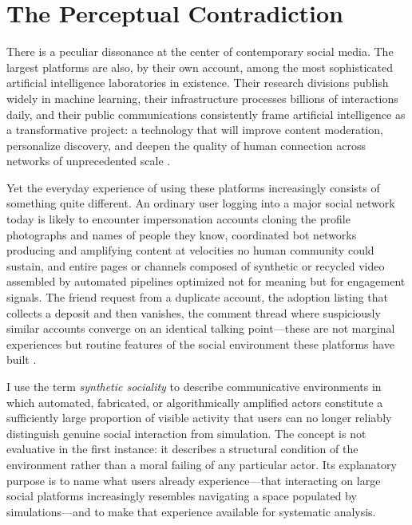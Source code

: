 \documentclass[12pt,a4paper]{article}
\begin{document}
\newpage

\section{The Perceptual Contradiction}

There is a peculiar dissonance at the center of contemporary social media. The largest platforms
are also, by their own account, among the most sophisticated artificial intelligence laboratories
in existence. Their research divisions publish widely in machine learning, their infrastructure
processes billions of interactions daily, and their public communications consistently frame
artificial intelligence as a transformative project: a technology that will improve content
moderation, personalize discovery, and deepen the quality of human connection across networks of
unprecedented scale \citep{zuboff2019,wu2016}.

Yet the everyday experience of using these platforms increasingly consists of something quite
different. An ordinary user logging into a major social network today is likely to encounter
impersonation accounts cloning the profile photographs and names of people they know, coordinated
bot networks producing and amplifying content at velocities no human community could sustain, and
entire pages or channels composed of synthetic or recycled video assembled by automated pipelines
optimized not for meaning but for engagement signals. The friend request from a duplicate account,
the adoption listing that collects a deposit and then vanishes, the comment thread where suspiciously
similar accounts converge on an identical talking point---these are not marginal experiences but
routine features of the social environment these platforms have built \citep{gillespie2018}.

I use the term \emph{synthetic sociality} to describe communicative environments in which
automated, fabricated, or algorithmically amplified actors constitute a sufficiently large
proportion of visible activity that users can no longer reliably distinguish genuine social
interaction from simulation. The concept is not evaluative in the first instance: it describes
a structural condition of the environment rather than a moral failing of any particular actor.
Its explanatory purpose is to name what users already experience---that interacting on large
social platforms increasingly resembles navigating a space populated by simulations---and to
make that experience available for systematic analysis.
\end{document}
